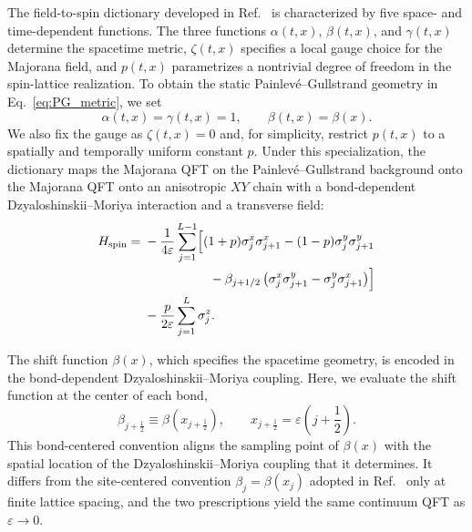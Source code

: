 \documentclass[reprint,amsmath,amssymb,aps,showkeys,superscriptaddress]{revtex4-2}
\begin{document}
The field-to-spin dictionary developed in
Ref.~\cite{Kinoshita2025} is characterized by five space- and
time-dependent functions. The three functions
$\alpha(t,x)$, $\beta(t,x)$, and $\gamma(t,x)$ determine the
spacetime metric, $\zeta(t,x)$ specifies a local gauge choice for the
Majorana field, and $p(t,x)$ parametrizes a nontrivial degree of freedom in the
spin-lattice realization. To obtain the static
Painlev\'e--Gullstrand geometry in Eq.~\eqref{eq:PG_metric}, we set
\begin{equation}
  \alpha(t,x)=\gamma(t,x)=1,
  \qquad
  \beta(t,x)=\beta(x).
  \label{eq:dictionary_specialization}
\end{equation}
We also fix the gauge as $\zeta(t,x)=0$ and, for simplicity, restrict
$p(t,x)$ to a spatially and temporally uniform constant $p$. 
Under this specialization, the dictionary maps the Majorana QFT on
the Painlev\'e--Gullstrand background onto the
Majorana QFT onto an anisotropic $XY$ chain with a bond-dependent Dzyaloshinskii--Moriya interaction and a transverse field:
\begin{align}
  H_{\mathrm{spin}}
  ={}&
  -\frac{1}{4\varepsilon}
  \sum_{j=1}^{L-1}
  \Bigl[
    (1+p)\sigma_j^x\sigma_{j+1}^x
    -(1-p)\sigma_j^y\sigma_{j+1}^y
  \nonumber\\
  &\hspace{18mm}
    -\beta_{j+1/2}
    \left(
      \sigma_j^x\sigma_{j+1}^y
      -
      \sigma_j^y\sigma_{j+1}^x
    \right)
  \Bigr]
  \nonumber\\
  &-\frac{p}{2\varepsilon}
  \sum_{j=1}^{L}\sigma_j^z.
  \label{eq:spin_Hamiltonian}
\end{align}


The shift function $\beta(x)$, which specifies the spacetime geometry, is encoded in the bond-dependent
Dzyaloshinskii--Moriya coupling. Here, we evaluate the shift function at the center of each bond,
\begin{equation}
  \beta_{j+\frac12}
  \equiv
  \beta\left(x_{j+\frac12}\right),
  \qquad
  x_{j+\frac12}
  =
  \varepsilon\left(j+\frac12\right).
  \label{eq:lattice_beta}
\end{equation}
This bond-centered convention aligns the sampling point of
$\beta(x)$ with the spatial location of the
Dzyaloshinskii--Moriya coupling that it determines. It differs from
the site-centered convention
$\beta_j=\beta(x_j)$ adopted in Ref.~\cite{Kinoshita2025} only at
finite lattice spacing, and the two prescriptions yield the same
continuum QFT as $\varepsilon\to0$.
\end{document}
